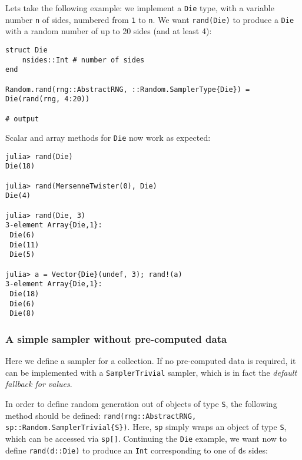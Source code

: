 Let{\textquotesingle}s take the following example: we implement a \texttt{Die} type, with a variable number \texttt{n} of sides, numbered from \texttt{1} to \texttt{n}. We want \texttt{rand(Die)} to produce a \texttt{Die} with a random number of up to 20 sides (and at least 4):




\begin{verbatim}
struct Die
    nsides::Int # number of sides
end

Random.rand(rng::AbstractRNG, ::Random.SamplerType{Die}) = Die(rand(rng, 4:20))

# output

\end{verbatim}



Scalar and array methods for \texttt{Die} now work as expected:




\begin{verbatim}
julia> rand(Die)
Die(18)

julia> rand(MersenneTwister(0), Die)
Die(4)

julia> rand(Die, 3)
3-element Array{Die,1}:
 Die(6)
 Die(11)
 Die(5)

julia> a = Vector{Die}(undef, 3); rand!(a)
3-element Array{Die,1}:
 Die(18)
 Die(6)
 Die(8)
\end{verbatim}



\hypertarget{14351717451744151937}{}


\subsubsection{A simple sampler without pre-computed data}



Here we define a sampler for a collection. If no pre-computed data is required, it can be implemented with a \texttt{SamplerTrivial} sampler, which is in fact the \emph{default fallback for values}.



In order to define random generation out of objects of type \texttt{S}, the following method should be defined: \texttt{rand(rng::AbstractRNG, sp::Random.SamplerTrivial\{S\})}. Here, \texttt{sp} simply wraps an object of type \texttt{S}, which can be accessed via \texttt{sp[]}. Continuing the \texttt{Die} example, we want now to define \texttt{rand(d::Die)} to produce an \texttt{Int} corresponding to one of \texttt{d}{\textquotesingle}s sides:




